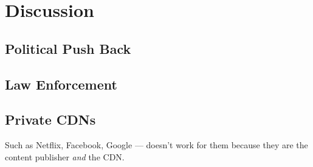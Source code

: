 \section{Discussion}
\label{sec:discussion}

\subsection{Political Push Back}

\subsection{Law Enforcement}

\subsection{Private CDNs}
Such as Netflix, Facebook, Google --- \system{} doesn't work for them because they are the content publisher {\it and} the CDN.
